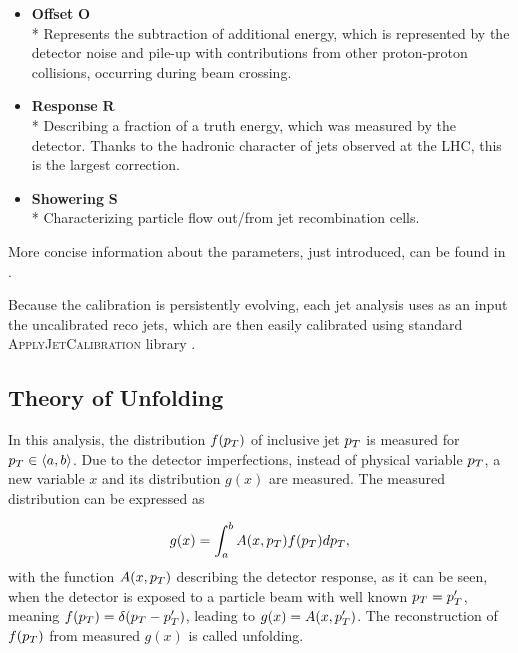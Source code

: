 \begin{itemize}
  \item \textbf{Offset} $\mathbf{O}$
  \\*
    Represents the subtraction of additional energy, which is represented by the
    detector noise and pile-up with contributions from other proton-proton
    collisions, occurring during beam crossing.

  \item \textbf{Response} $\mathbf{R}$
  \\*
    Describing a fraction of a truth energy, which was measured by the
    detector. Thanks to the hadronic character of jets observed at the LHC, this
    is the largest correction.

  \item \textbf{Showering} $\mathbf{S}$
  \\*
    Characterizing particle flow out/from jet recombination cells.

\end{itemize}

More concise information about the parameters, just introduced, can be found in
\cite{ZdenekThesis}.

Because the calibration is persistently evolving, each jet analysis uses as an
input the uncalibrated reco jets, which are then easily calibrated using
standard \textsc{ApplyJetCalibration} library \cite{ApplyJetCalibration}.

\subsection{Theory of Unfolding}

In this analysis, the distribution $f(p_{T})$ of inclusive jet $p_{T}$ is measured
for $p_{T} \in \langle a, b \rangle$. Due to the detector imperfections,
instead of physical variable $p_{T}$, a new variable $x$ and its distribution
$g(x)$ are measured. The measured distribution can be expressed as

\begin{equation}
  g(x) = \int_a^b A(x, p_{T}) f(p_{T}) dp_{T},
  \label{eq:UnfoldingBasicDefinition}
\end{equation}
with the function $A(x, p_{T})$ describing the detector response, as it can be
seen, when the detector is exposed to a particle beam with well known $p_{T} =
p_{T}'$, meaning $f(p_{T}) = \delta(p_{T} - p_{T}')$, leading to $g(x) = A(x, p_{T}')$. The
reconstruction of $f(p_{T})$ from measured $g(x)$ is called unfolding.

